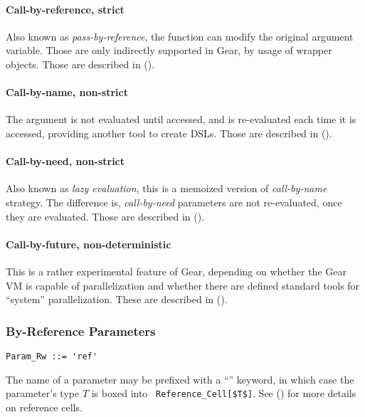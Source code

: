 \paragraph{Call-by-reference, strict}
Also known as {\em pass-by-reference}, the function can modify the original argument variable. Those are only indirectly supported in Gear, by usage of wrapper objects. Those are described in ().

\paragraph{Call-by-name, non-strict}
The argument is not evaluated until accessed, and is re-evaluated each time it is accessed, providing another tool to create DSLs. Those are described in (). 

\paragraph{Call-by-need, non-strict}
Also known as {\em lazy evaluation}, this is a memoized version of {\em call-by-name} strategy. The difference is, {\em call-by-need} parameters are not re-evaluated, once they are evaluated. Those are described in (). 

\paragraph{Call-by-future, non-deterministic}
This is a rather experimental feature of Gear, depending on whether the Gear VM is capable of parallelization and whether there are defined standard tools for ``system'' parallelization. These are described in ().





\subsubsection{By-Reference Parameters}
\label{sec:by-ref-parameters}

\syntax\begin{lstlisting}
Param_Rw ::= 'ref'
\end{lstlisting}

The name of a parameter may be prefixed with a ``'' keyword, in which case the parameter's type $T$ is boxed into ~\lstinline!Reference_Cell[$T$]!. See () for more details on reference cells. 





